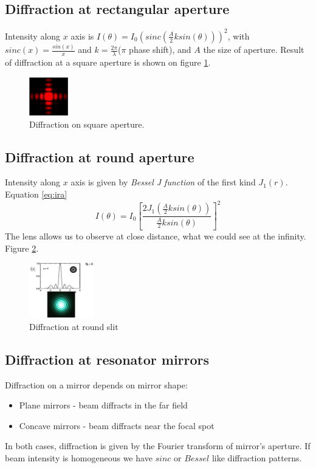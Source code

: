 \subsection{Diffraction at rectangular aperture}
Intensity along $x$ axis is $I(\theta) = I_0 (sinc(\frac{A}{2} k sin(\theta)))^2$, with $sinc(x) = \frac{sin(x)}{x}$ 
and $k = \frac{2\pi}{\lambda}$($\pi$ phase shift), and $A$ the size of aperture.
Result of diffraction at a square aperture is shown on figure \ref{fig:squareaprture}.
\begin{figure}[h!]
    \centering
    \includegraphics[width=0.15\textwidth]{slike/squareAdiff.png}
    \caption{Diffraction on square aperture. \sln}
    \label{fig:squareaprture}
\end{figure}

\subsection{Diffraction at round aperture}
Intensity along $x$ axis is given by \textit{Bessel J function} of the first kind $J_1(r)$. Equation \ref{eq:ira}
\begin{equation}
    I(\theta) = I_0 \left[\frac{2 J_1(\frac{A}{2} k sin(\theta))}{\frac{A}{2} k sin(\theta)}\right]^2
    \label{eq:ira}
\end{equation}
The lens allows us to observe at close distance, what we could see at the infinity. Figure \ref{fig:radf}.
\begin{figure}[h!]
    \centering
    \includegraphics[width=0.25\textwidth]{slike/difSslt.png}
    \caption{Diffraction at round slit}
    \label{fig:radf}
\end{figure}

\subsection{Diffraction at resonator mirrors}
Diffraction on a mirror depends on mirror shape:
\begin{itemize}
    \item Plane mirrors - beam diffracts in the far field
    \item Concave mirrors - beam diffracts near the focal spot
\end{itemize}
In both cases, diffraction is given by the Fourier transform of mirror's aperture.
If beam intensity is homogeneous we have $sinc$ or $Bessel $ like diffraction patterns.

